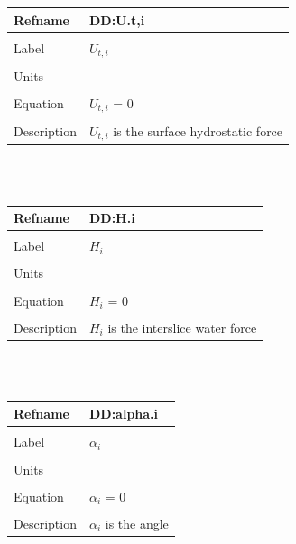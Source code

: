 \documentclass[12pt]{article}
\begin{document}
\noindent \begin{minipage}{\textwidth}
\begin{tabular}{p{} p{}}
\toprule \textbf{Refname} & \textbf{DD:U.t,i}
\label{DD:U.t,i}
\\ \midrule \\
Label & $U_{t,i}$
\\ \midrule \\
Units & 
\\ \midrule \\
Equation & $U_{t,i}$ = $0$
\\ \midrule \\
Description & $U_{t,i}$ is the surface hydrostatic force
\\ \bottomrule \end{tabular}
\end{minipage}\\
~\newline
\noindent \begin{minipage}{\textwidth}
\begin{tabular}{p{} p{}}
\toprule \textbf{Refname} & \textbf{DD:H.i}
\label{DD:H.i}
\\ \midrule \\
Label & $H_{i}$
\\ \midrule \\
Units & 
\\ \midrule \\
Equation & $H_{i}$ = $0$
\\ \midrule \\
Description & $H_{i}$ is the interslice water force
\\ \bottomrule \end{tabular}
\end{minipage}\\
~\newline
\noindent \begin{minipage}{\textwidth}
\begin{tabular}{p{} p{}}
\toprule \textbf{Refname} & \textbf{DD:alpha.i}
\label{DD:alpha.i}
\\ \midrule \\
Label & $\alpha{}_{i}$
\\ \midrule \\
Units & 
\\ \midrule \\
Equation & $\alpha{}_{i}$ = $0$
\\ \midrule \\
Description & $\alpha{}_{i}$ is the angle
\\ \bottomrule \end{tabular}
\end{minipage}\\
\end{document}
